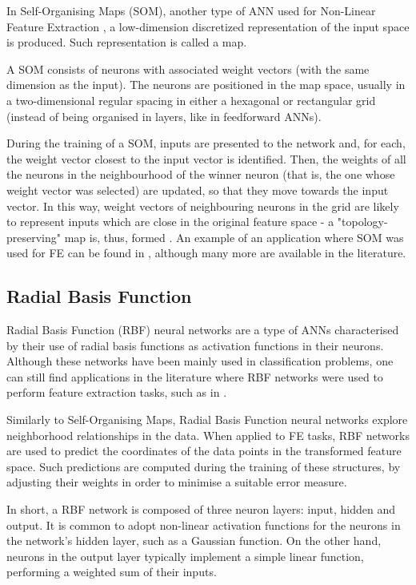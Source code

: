 \documentclass[9pt,journal,compsoc]{IEEEtran}
\begin{document}
In Self-Organising Maps (SOM), another type of ANN used for Non-Linear Feature Extraction \cite{jain2000statistical, hira2015review}, a low-dimension discretized representation of the input space is produced. Such representation is called a map.

A SOM consists of neurons with associated weight vectors (with the same dimension as the input). The neurons are positioned in the map space, usually in a two-dimensional regular spacing in either a hexagonal or rectangular grid (instead of being organised in layers, like in feedforward ANNs).

During the training of a SOM, inputs are presented to the network and, for each, the weight vector closest to the input vector is identified. Then, the weights of all the neurons in the neighbourhood of the winner neuron (that is, the one whose weight vector was selected) are updated, so that they move towards the input vector. In this way, weight vectors of neighbouring neurons in the grid are likely to represent inputs which are close in the original feature space - a "topology-preserving" map is, thus, formed \cite{kohonen1995self, villmann1997topology}. An example of an application where SOM was used for FE can be found in \cite{lawrence1997face}, although many more are available in the literature.

\subsection{Radial Basis Function}

Radial Basis Function (RBF) neural networks are a type of ANNs characterised by their use of radial basis functions as activation functions in their neurons. Although these networks have been mainly used in classification problems, one can still find applications in the literature where RBF networks were used to perform feature extraction tasks, such as in \cite{lowe1997neuroscale}.

Similarly to Self-Organising Maps, Radial Basis Function neural networks explore neighborhood relationships in the data. When applied to FE tasks, RBF networks are used to predict the coordinates of the data points in the transformed feature space. Such predictions are computed during the training of these structures, by adjusting their weights in order to minimise a suitable error measure.

In short, a RBF network is composed of three neuron layers: input, hidden and output. It is common to adopt non-linear activation functions for the neurons in the network's hidden layer, such as a Gaussian function. On the other hand, neurons in the output layer typically implement a simple linear function, performing a weighted sum of their inputs.
\end{document}

